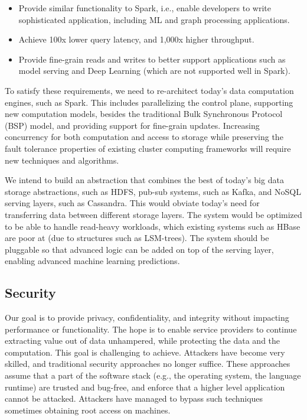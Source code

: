 \begin{itemize}[noitemsep,topsep=0pt,parsep=0pt,partopsep=0pt]
\item Provide similar functionality to Spark, i.e., enable developers to write sophisticated application, including ML and graph processing applications.
\item Achieve 100x lower query latency, and 1,000x higher throughput.
\item Provide fine-grain reads and writes to better support applications such as model serving and Deep Learning (which are not supported well in Spark).
\end{itemize}

To satisfy these requirements, we need to re-architect today's data computation engines, such as Spark. This includes parallelizing the control plane, supporting new computation models, besides the traditional Bulk Synchronous Protocol (BSP) model, and providing support for fine-grain updates. Increasing concurrency for both computation and access to storage while preserving the fault tolerance properties of existing cluster computing frameworks will require new techniques and algorithms.

We intend to build an abstraction that combines the best of today's big data storage abstractions, such as HDFS, pub-sub systems, such as Kafka, and NoSQL serving layers, such as Cassandra. This would obviate today's need for transferring data between different storage layers. The system would be optimized to be able to handle read-heavy workloads, which existing systems such as HBase are poor at (due to structures such as LSM-trees). The system should be pluggable so that advanced logic can be added on top of the serving layer, enabling advanced machine learning predictions. 

\subsection{Security} 

Our goal is to provide privacy, confidentiality, and integrity without impacting performance or functionality. The hope is to enable service providers to continue extracting value out of data unhampered, while protecting the data and the computation. This goal is challenging to achieve. Attackers have become very skilled, and traditional security approaches no longer suffice. These approaches assume that a part of the software stack (e.g., the operating system, the language runtime) are trusted and bug-free, and enforce that a higher level application cannot be attacked. Attackers have managed to bypass such techniques sometimes obtaining root access on machines.

